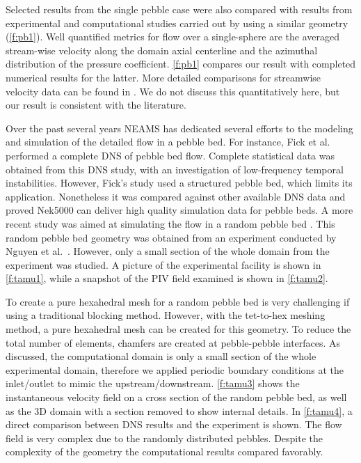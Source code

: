 Selected results from the single pebble case were also compared with results from experimental and computational studies carried out by using a similar geometry (\autoref{f:pb1}).
Well quantified metrics for flow over a single-sphere are the averaged stream-wise velocity along the domain axial centerline and the azimuthal distribution of the pressure coefficient.
\autoref{f:pb1} compares our result with completed numerical results for the latter.
More detailed comparisons for streamwise velocity data can be found in \cite{fick2017investigation}.
We do not discuss this quantitatively here, but our result is consistent with the literature.

Over the past several years NEAMS has dedicated several efforts to the modeling and simulation of the detailed flow in a pebble bed.
For instance, Fick et al.~\cite{fick2017direct}  performed a complete DNS of pebble bed flow.
Complete statistical data was obtained from this DNS study, with an investigation of low-frequency temporal instabilities.
However, Fick's study \cite{fick2017direct} used a structured pebble bed, which limits its application.
Nonetheless it was compared against other available DNS data and proved Nek5000 can deliver high quality simulation data for pebble beds.
A more recent study was aimed at simulating the flow in a random pebble bed \cite{yildiz2020direct}.
This random pebble bed geometry was obtained from an experiment conducted by Nguyen et al.~\cite{nguyen2018time}.
However, only a small section of the whole domain from the experiment was studied.
A picture of the experimental facility is shown in \autoref{f:tamu1}, while a snapshot of the PIV field examined is shown in \autoref{f:tamu2}.

To create a pure hexahedral mesh for a random pebble bed is very challenging if using a traditional blocking method.
However, with the tet-to-hex meshing method, a pure hexahedral mesh can be created for this geometry.
To reduce the total number of elements, chamfers are created at pebble-pebble interfaces.
As discussed, the computational domain is only a small section of the whole experimental domain, therefore we applied periodic boundary conditions at the inlet/outlet to mimic the upstream/downstream.
\autoref{f:tamu3} shows the instantaneous velocity field on a cross section of the random pebble bed, as well as the 3D domain with a section removed to show internal details.
In \autoref{f:tamu4}, a direct comparison between DNS results and the experiment is shown.
The flow field is very complex due to the randomly distributed pebbles.
Despite the complexity of the geometry the computational results compared favorably.

